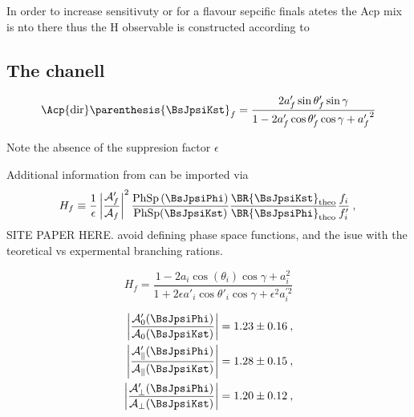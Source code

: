 In order to increase sensitivuty or for a flavour sepcific finals atetes the Acp mix is nto there thus the H observable is constructed
according to

\subsection{The \BsJpsiKst chanell}

\begin{equation}
  \Acp{\rm dir}\parenthesis{\BsJpsiKst}_f = \frac{ 2a'_f \sin\theta'_f \sin\gamma} {1 - 2a'_f \cos\theta'_f \cos\gamma +  {a'_f}^{2}}
  \label{bsjpsikst_peng_acp_obs}
\end{equation}

Note the absence of the suppresion factor $\epsilon$

Additional information from \BsJpsiKst can be imported via
\begin{equation}
  H_f \equiv \frac{1}{\epsilon} \left|\frac{\mathcal{A}'_f}{\mathcal{A}_f}\right|^2
  \frac{\text{PhSp}\left(\BsJpsiPhi\right)}{\text{PhSp}(\BsJpsiKst)}
  \frac{\BR{\BsJpsiKst}_{\text{theo}}}{\BR{\BsJpsiPhi}_{\text{theo}}}
  \frac{f_i}{f'_i}\:,  \\
\label{bsjpsikst_Hobs_def}
\end{equation}
{\color{red} SITE PAPER HERE. avoid defining phase space functions, and the isue with the teoretical vs expermental branching rations.}


\begin{equation}
  H_f = \frac{1-2a_i \cos(\theta_i) \cos\gamma+a_i^{2}}{1+2\epsilon a'_i \cos\theta'_i\cos\gamma +\epsilon^2 a_i^{\prime 2}}
\label{bsjpsikst_Hobs_param}
\end{equation}

\begin{align}
\left|\frac{\mathcal{A}'_0(\BsJpsiPhi)}{\mathcal{A}_0(\BsJpsiKst)}\right| & = 1.23 \pm 0.16\:,\label{Eq:AmpRat_JpsiKstar_long}\\
\left|\frac{\mathcal{A}'_{\parallel}(\BsJpsiPhi)}{\mathcal{A}_{\parallel}(\BsJpsiKst)}\right| & = 1.28 \pm 0.15\:,\\
\left|\frac{\mathcal{A}'_{\perp}(\BsJpsiPhi)}{\mathcal{A}_{\perp}(\BsJpsiKst)}\right| & = 1.20 \pm 0.12\:,\label{Eq:AmpRat_JpsiKstar_perp}
\end{align}


